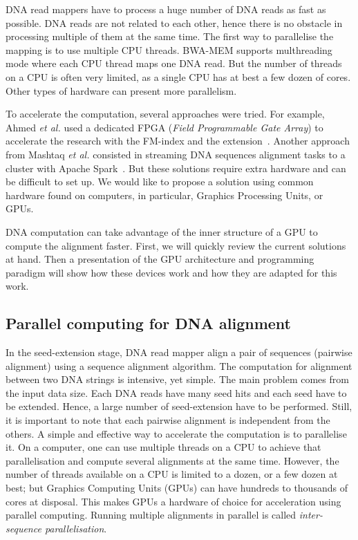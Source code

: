 DNA read mappers have to process a huge number of DNA reads as fast as possible. DNA reads are not related to each other, hence there is no obstacle in processing multiple of them at the same time. The first way to parallelise the mapping is to use multiple CPU threads. BWA-MEM supports multhreading mode where each CPU thread maps one DNA read. But the number of threads on a CPU is often very limited, as a single CPU has at best a few dozen of cores. Other types of hardware can present more parallelism.

To accelerate the computation, several approaches were tried. For example, Ahmed \emph{et al.} used a dedicated FPGA (\emph{Field Programmable Gate Array}) to accelerate the research with the FM-index and the extension~\cite{Ahmed:FPGA}. Another approach from Mashtaq \emph{et al.} consisted in streaming DNA sequences alignment tasks to a cluster with Apache Spark~\cite{Mushtaq:spark}. But these solutions require extra hardware and can be difficult to set up. We would like to propose a solution using common hardware found on computers, in particular, Graphics Processing Units, or GPUs.

DNA computation can take advantage of the inner structure of a GPU to compute the alignment faster. First, we will quickly review the current solutions at hand. Then a presentation of the GPU architecture and programming paradigm will show how these devices work and how they are adapted for this work.

\subsection{Parallel computing for DNA alignment}
In the seed-extension stage, DNA read mapper align a pair of sequences (pairwise alignment) using a sequence alignment algorithm.
The computation for alignment between two DNA strings is intensive, yet simple. The main problem comes from the input data size. Each DNA reads have many seed hits and each seed have to be extended. Hence, a large number of seed-extension have to be performed. Still, it is important to note that each pairwise alignment is independent from the others. A simple and effective way to accelerate the computation is to parallelise it. On a computer, one can use multiple threads on a CPU to achieve that parallelisation and compute several alignments at the same time. However, the number of threads available on a CPU is limited to a dozen, or a few dozen at best; but Graphics Computing Units (GPUs) can have hundreds to thousands of cores at disposal. This makes GPUs a hardware of choice for acceleration using parallel computing. Running multiple alignments in parallel is called \emph{inter-sequence parallelisation}. 

